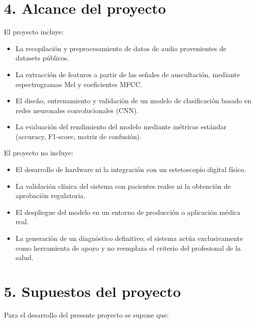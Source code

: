 \documentclass[
11pt, %
]{charter}
\begin{document}
\section{4. Alcance del proyecto}
\label{sec:alcance}

El proyecto incluye:
\begin{itemize}
	\item La recopilación y preprocesamiento de datos de audio provenientes de datasets públicos.
	\item La extracción de features a partir de las señales de auscultación, mediante espectrogramas Mel y coeficientes MFCC.
	\item El diseño, entrenamiento y validación de un modelo de clasificación basado en redes neuronales convolucionales (CNN).
	\item La evaluación del rendimiento del modelo mediante métricas estándar (accuracy, F1-score, matriz de confusión).
		\end{itemize}

El proyecto no incluye:
\begin{itemize}
	\item El desarrollo de hardware ni la integración con un estetoscopio digital físico.
	\item La validación clínica del sistema con pacientes reales ni la obtención de aprobación regulatoria.
	\item El despliegue del modelo en un entorno de producción o aplicación médica real.
	\item La generación de un diagnóstico definitivo; el sistema actúa exclusivamente como herramienta de apoyo y no reemplaza el 
	criterio del profesional de la salud.
\end{itemize}

\section{5. Supuestos del proyecto}
\label{sec:supuestos}

Para el desarrollo del presente proyecto se supone que:
\end{document}
